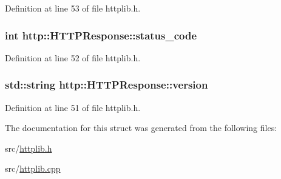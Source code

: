 Definition at line 53 of file httplib.\+h.

\subsubsection[{\texorpdfstring{status\+\_\+code}{status_code}}]{\setlength{\rightskip}{0pt plus 5cm}int http\+::\+H\+T\+T\+P\+Response\+::status\+\_\+code}\hypertarget{structhttp_1_1HTTPResponse_a5857363345f576492ec4d7d1cd581433}{}\label{structhttp_1_1HTTPResponse_a5857363345f576492ec4d7d1cd581433}


Definition at line 52 of file httplib.\+h.

\subsubsection[{\texorpdfstring{version}{version}}]{\setlength{\rightskip}{0pt plus 5cm}std\+::string http\+::\+H\+T\+T\+P\+Response\+::version}\hypertarget{structhttp_1_1HTTPResponse_a777b248557b9b4d7ea708903d32a6f65}{}\label{structhttp_1_1HTTPResponse_a777b248557b9b4d7ea708903d32a6f65}


Definition at line 51 of file httplib.\+h.



The documentation for this struct was generated from the following files\+:\begin{DoxyCompactItemize}
\item 
src/\hyperlink{httplib_8h}{httplib.\+h}\item 
src/\hyperlink{httplib_8cpp}{httplib.\+cpp}\end{DoxyCompactItemize}
